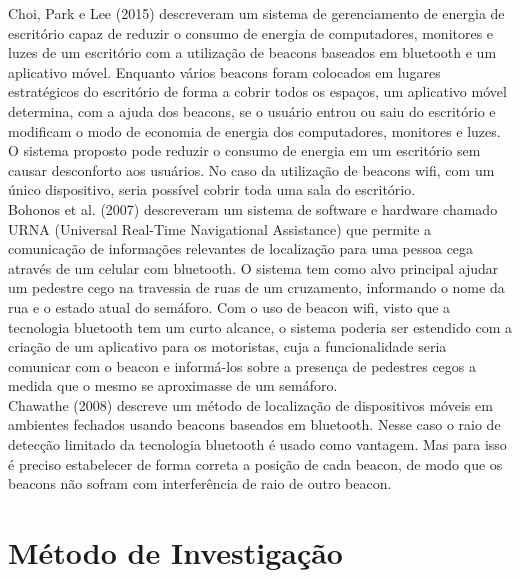 Choi, Park e Lee (2015) descreveram um sistema de gerenciamento de energia de escritório capaz de reduzir o consumo de energia de computadores, monitores e luzes de um escritório com a utilização de beacons baseados em bluetooth e um aplicativo móvel. Enquanto vários beacons foram colocados em lugares estratégicos do escritório de forma a cobrir todos os espaços, um aplicativo móvel determina, com a ajuda dos beacons, se o usuário entrou ou saiu do escritório e modificam o modo de economia de energia dos computadores, monitores e luzes. O sistema proposto pode reduzir o consumo de energia em um escritório sem causar desconforto aos usuários. No caso da utilização de beacons wifi, com um único dispositivo, seria possível cobrir toda uma sala do escritório. \\
\indent Bohonos et al. (2007) descreveram um sistema de software e hardware chamado URNA (Universal Real-Time Navigational Assistance) que permite a comunicação de informações relevantes de localização para uma pessoa cega através de um celular com bluetooth. O sistema tem como alvo principal ajudar um pedestre cego na travessia de ruas de um cruzamento, informando o nome da rua e o estado atual do semáforo. Com o uso de beacon wifi, visto que a tecnologia bluetooth tem um curto alcance, o sistema poderia ser estendido com a criação de um aplicativo para os motoristas, cuja a funcionalidade seria comunicar com o beacon e informá-los sobre a presença de pedestres cegos a medida que o mesmo se aproximasse de um semáforo. \\
\indent Chawathe (2008) descreve um método de localização de dispositivos móveis em ambientes fechados usando beacons baseados em bluetooth. Nesse caso o raio de detecção limitado da tecnologia bluetooth é usado como vantagem. Mas para isso é preciso estabelecer de forma correta a posição de cada beacon, de modo que os beacons não sofram com interferência de raio de outro beacon.

\section{Método de Investigação}
\label{sec:metodo-investigacao}

